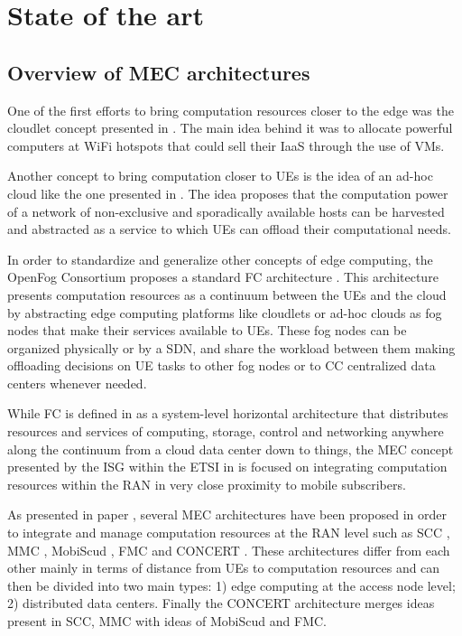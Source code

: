 \chapter{State of the art}
\label{chap:stateoftheart}
\section{Overview of \acrshort{MEC} architectures} \label{section:MECarch}

\noindent One of the first efforts to bring computation resources closer to the edge was the cloudlet concept presented in \cite{cloudlet}. The main idea behind it was to allocate powerful computers at WiFi hotspots that could sell their \acrfull{IaaS} through the use of \acrfull{VMs}.

Another concept to bring computation closer to \acrshort{UE}s is the idea of an ad-hoc cloud like the one presented in \cite{adhoc}. The idea proposes that the computation power of a network of non-exclusive and sporadically available hosts can be harvested and abstracted as a service to which \acrshort{UE}s can offload their computational needs.

In order to standardize and generalize other concepts of edge computing, the OpenFog Consortium proposes a standard \acrfull{FC} architecture \cite{OpenFog}. This architecture presents computation resources as a continuum between the \acrshort{UE}s and the cloud by abstracting edge computing platforms like cloudlets or ad-hoc clouds as fog nodes that make their services available to \acrshort{UE}s. These fog nodes can be organized physically or by a \acrfull{SDN}, and share the workload between them making offloading decisions on \acrshort{UE} tasks to other fog nodes or to \acrshort{CC} centralized data centers whenever needed. 

While \acrshort{FC} is defined in \cite{OpenFog} as a system-level horizontal architecture that distributes resources and services of computing, storage, control and networking anywhere along the continuum from a cloud data center down to things, the \acrfull{MEC} concept presented by the \acrfull{ISG} within the \acrfull{ETSI} in \cite{MECspec} is focused on integrating computation resources within the \acrfull{RAN} in very close proximity to mobile subscribers.

As presented in paper \cite{SHAKARAMI2020107496}, several \acrshort{MEC} architectures have been proposed in order to integrate and manage computation resources at the \acrshort{RAN} level such as \acrfull{SCC} \cite{smallcellcloud}, \acrfull{MMC} \cite{mmcloud}, \acrfull{MobiScud} \cite{MobiScud}, \acrfull{FMC} \cite{fmcloud} and CONCERT \cite{CONCERT}. These architectures differ from each other mainly in terms of distance from \acrshort{UE}s to computation resources and can then be divided into two main types: 1) edge computing at the access node level; 2) distributed data centers. Finally the CONCERT architecture merges ideas present in \acrshort{SCC}, \acrshort{MMC} with ideas of \acrshort{MobiScud} and \acrshort{FMC}.

